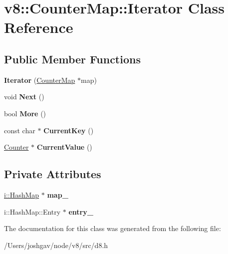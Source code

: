 \hypertarget{classv8_1_1_counter_map_1_1_iterator}{}\section{v8\+:\+:Counter\+Map\+:\+:Iterator Class Reference}
\label{classv8_1_1_counter_map_1_1_iterator}
\subsection*{Public Member Functions}
\begin{DoxyCompactItemize}
\item 
{\bfseries Iterator} (\hyperlink{classv8_1_1_counter_map}{Counter\+Map} $\ast$map)\hypertarget{classv8_1_1_counter_map_1_1_iterator_a85550e73da3d0a69bff7369706809c58}{}\label{classv8_1_1_counter_map_1_1_iterator_a85550e73da3d0a69bff7369706809c58}

\item 
void {\bfseries Next} ()\hypertarget{classv8_1_1_counter_map_1_1_iterator_a4b4c3728478a6922be1cb79819b39d1d}{}\label{classv8_1_1_counter_map_1_1_iterator_a4b4c3728478a6922be1cb79819b39d1d}

\item 
bool {\bfseries More} ()\hypertarget{classv8_1_1_counter_map_1_1_iterator_afd1554bf0d45dd1f20e49abffeb48ae4}{}\label{classv8_1_1_counter_map_1_1_iterator_afd1554bf0d45dd1f20e49abffeb48ae4}

\item 
const char $\ast$ {\bfseries Current\+Key} ()\hypertarget{classv8_1_1_counter_map_1_1_iterator_a06b41a62e30a550c53081ef7d205b5a9}{}\label{classv8_1_1_counter_map_1_1_iterator_a06b41a62e30a550c53081ef7d205b5a9}

\item 
\hyperlink{classv8_1_1_counter}{Counter} $\ast$ {\bfseries Current\+Value} ()\hypertarget{classv8_1_1_counter_map_1_1_iterator_a67090916d5c46a83bc4f361094825d30}{}\label{classv8_1_1_counter_map_1_1_iterator_a67090916d5c46a83bc4f361094825d30}

\end{DoxyCompactItemize}
\subsection*{Private Attributes}
\begin{DoxyCompactItemize}
\item 
\hyperlink{classv8_1_1internal_1_1_template_hash_map_impl}{i\+::\+Hash\+Map} $\ast$ {\bfseries map\+\_\+}\hypertarget{classv8_1_1_counter_map_1_1_iterator_a81c96d4e0b7b03a374bfbf57388bf4c0}{}\label{classv8_1_1_counter_map_1_1_iterator_a81c96d4e0b7b03a374bfbf57388bf4c0}

\item 
i\+::\+Hash\+Map\+::\+Entry $\ast$ {\bfseries entry\+\_\+}\hypertarget{classv8_1_1_counter_map_1_1_iterator_a40db5445662896347a546701b60f0139}{}\label{classv8_1_1_counter_map_1_1_iterator_a40db5445662896347a546701b60f0139}

\end{DoxyCompactItemize}


The documentation for this class was generated from the following file\+:\begin{DoxyCompactItemize}
\item 
/\+Users/joshgav/node/v8/src/d8.\+h\end{DoxyCompactItemize}
